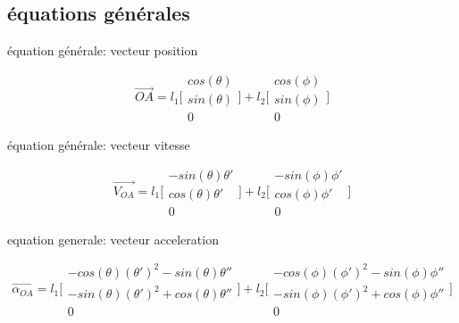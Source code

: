 \documentclass{article}
\begin{document}
\subsection{équations générales}

équation générale: vecteur position

\begin{equation}
\overrightarrow{OA} = 
    l_1\Bigg[\begin{array}{cc}
    cos(\theta) \\
    sin(\theta) \\
    0
    \end{array}\Bigg]
    +
    l_2\Bigg[\begin{array}{cc}
    cos(\phi) \\
    sin(\phi) \\
    0
    \end{array}\Bigg]
\end{equation}

\noindent équation générale: vecteur vitesse

\begin{equation}
\overrightarrow{V_{OA}} = 
    l_1\Bigg[\begin{array}{cc}
    -sin(\theta)\theta' \\
    cos(\theta)\theta' \\
    0
    \end{array}\Bigg]
    +
    l_2\Bigg[\begin{array}{cc}
    -sin(\phi)\phi' \\
    cos(\phi)\phi' \\
    0
    \end{array}\Bigg]
\end{equation}

\noindent equation generale: vecteur acceleration

\begin{equation}
\overrightarrow{\alpha_{OA}} =
	l_1\Bigg[\begin{array}{cc}
	-cos(\theta)(\theta')^2-sin(\theta)\theta'' \\
	-sin(\theta)(\theta')^2+cos(\theta)\theta'' \\
	0
	\end{array}\Bigg]
	+
	l_2\Bigg[\begin{array}{cc}
	-cos(\phi)(\phi')^2-sin(\phi)\phi'' \\
	-sin(\phi)(\phi')^2+cos(\phi)\phi'' \\
	0
	\end{array}\Bigg]
\end{equation}
\end{document}
